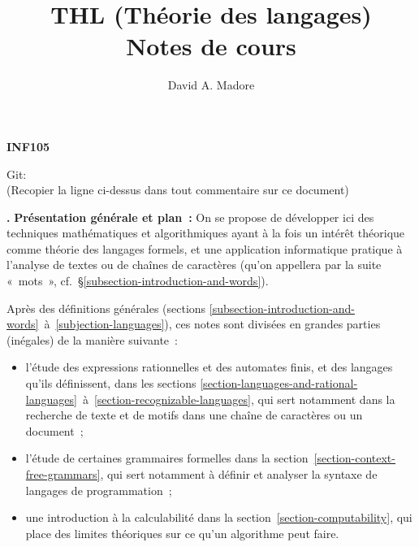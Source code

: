 \documentclass[12pt,a4paper]{article}
\theoremstyle{definition}
\newcommand\thingy{%
\refstepcounter{comcnt}\medskip\noindent\textbf{\thecomcnt.} }
\begin{document}
\title{THL (Théorie des langages)\\Notes de cours}
\author{David A. Madore}
\maketitle

\centerline{\textbf{INF105}}

\vskip2cm

{\footnotesize
\immediate{}
\begin{center}
Git: 
\\
(Recopier la ligne ci-dessus dans tout commentaire sur ce document)
\end{center}
\immediate{}
\par}


\vskip3cm


%
%
%

{\footnotesize
\tableofcontents
\par}

\bigbreak

\setcounter{comcnt}{0}

\thingy \textbf{Présentation générale et plan :} On se propose de
développer ici des techniques mathématiques et algorithmiques ayant à
la fois un intérêt théorique comme théorie des langages formels, et
une application informatique pratique à l'analyse de textes ou de
chaînes de caractères (qu'on appellera par la suite « mots »,
cf. §\ref{subsection-introduction-and-words}).

\smallbreak

Après des définitions générales (sections
\ref{subsection-introduction-and-words} à \ref{subjection-languages}),
ces notes sont divisées en grandes parties (inégales) de la manière
suivante :
\begin{itemize}
\item l'étude des expressions rationnelles et des automates finis, et
  des langages qu'ils définissent, dans les sections
  \ref{section-languages-and-rational-languages} à \ref{section-recognizable-languages},
  qui sert notamment dans la recherche de texte et de motifs dans une
  chaîne de caractères ou un document ;
\item l'étude de certaines grammaires formelles dans la
  section \ref{section-context-free-grammars}, qui sert notamment à
  définir et analyser la syntaxe de langages de programmation ;
\item une introduction à la calculabilité dans la
  section \ref{section-computability}, qui place des limites
  théoriques sur ce qu'un algorithme peut faire.
\end{itemize}
\end{document}
